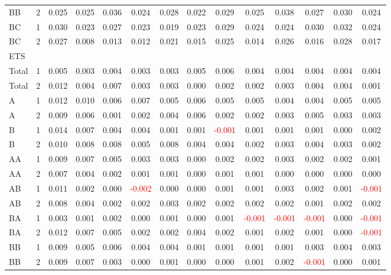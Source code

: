 \begin{table}[H]
{\begin{tabular}{llcccccccccccc}
BB & 2 & 0.025 & 0.025 & 0.036 & 0.024 & 0.028 & 0.022 & 0.029 & 0.025 & 0.038 & 0.027 & 0.030 & 0.024\\
BC & 1 & 0.030 & 0.023 & 0.027 & 0.023 & 0.019 & 0.023 & 0.029 & 0.024 & 0.024 & 0.030 & 0.032 & 0.024\\
BC & 2 & 0.027 & 0.008 & 0.013 & 0.012 & 0.021 & 0.015 & 0.025 & 0.014 & 0.026 & 0.016 & 0.028 & 0.017\\
\hline
ETS &  &  &  &  &  &  &  &  &  &  &  &  & \\
\hline
Total & 1 & 0.005 & 0.003 & 0.004 & 0.003 & 0.003 & 0.005 & 0.006 & 0.004 & 0.004 & 0.004 & 0.004 & 0.004\\
Total & 2 & 0.012 & 0.004 & 0.007 & 0.003 & 0.003 & 0.000 & 0.002 & 0.002 & 0.003 & 0.004 & 0.004 & 0.001\\
A & 1 & 0.012 & 0.010 & 0.006 & 0.007 & 0.005 & 0.006 & 0.005 & 0.005 & 0.004 & 0.004 & 0.005 & 0.005\\
A & 2 & 0.009 & 0.006 & 0.001 & 0.002 & 0.004 & 0.006 & 0.002 & 0.002 & 0.003 & 0.005 & 0.003 & 0.003\\
B & 1 & 0.014 & 0.007 & 0.004 & 0.004 & 0.001 & 0.001 & \textcolor{red}{-0.001} & 0.001 & 0.001 & 0.001 & 0.000 & 0.002\\
B & 2 & 0.010 & 0.008 & 0.008 & 0.005 & 0.008 & 0.004 & 0.004 & 0.002 & 0.003 & 0.004 & 0.003 & 0.002\\
AA & 1 & 0.009 & 0.007 & 0.005 & 0.003 & 0.003 & 0.000 & 0.002 & 0.002 & 0.003 & 0.002 & 0.002 & 0.001\\
AA & 2 & 0.007 & 0.004 & 0.002 & 0.001 & 0.001 & 0.000 & 0.001 & 0.001 & 0.000 & 0.000 & 0.000 & 0.000\\
AB & 1 & 0.011 & 0.002 & 0.000 & \textcolor{red}{-0.002} & 0.000 & 0.000 & 0.001 & 0.001 & 0.003 & 0.002 & 0.001 & \textcolor{red}{-0.001}\\
AB & 2 & 0.008 & 0.004 & 0.002 & 0.002 & 0.003 & 0.002 & 0.002 & 0.002 & 0.002 & 0.001 & 0.002 & 0.002\\
BA & 1 & 0.003 & 0.001 & 0.002 & 0.000 & 0.001 & 0.000 & 0.001 & \textcolor{red}{-0.001} & \textcolor{red}{-0.001} & \textcolor{red}{-0.001} & 0.000 & \textcolor{red}{-0.001}\\
BA & 2 & 0.012 & 0.007 & 0.005 & 0.002 & 0.002 & 0.004 & 0.002 & 0.001 & 0.002 & 0.001 & 0.000 & \textcolor{red}{-0.001}\\
BB & 1 & 0.009 & 0.005 & 0.006 & 0.004 & 0.004 & 0.001 & 0.001 & 0.001 & 0.001 & 0.003 & 0.004 & 0.003\\
BB & 2 & 0.009 & 0.007 & 0.003 & 0.000 & 0.001 & 0.000 & 0.000 & 0.001 & 0.002 & \textcolor{red}{-0.001} & 0.000 & 0.001\\

\end{tabular}}
\end{table}
